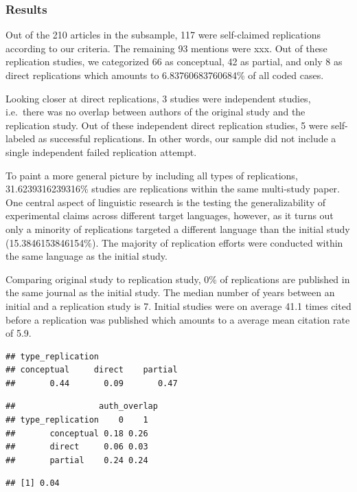 \documentclass[]{elsarticle} %
\begin{document}
\hypertarget{results-1}{%
\subsubsection{Results}\label{results-1}}

Out of the 210 articles in the subsample, 117 were self-claimed
replications according to our criteria. The remaining 93 mentions were
xxx. Out of these replication studies, we categorized 66 as conceptual,
42 as partial, and only 8 as direct replications which amounts to
6.83760683760684\% of all coded cases.

Looking closer at direct replications, 3 studies were independent
studies, i.e.~there was no overlap between authors of the original study
and the replication study. Out of these independent direct replication
studies, 5 were self-labeled as successful replications. In other words,
our sample did not include a single independent failed replication
attempt.

To paint a more general picture by including all types of replications,
31.6239316239316\% studies are replications within the same multi-study
paper. One central aspect of linguistic research is the testing the
generalizability of experimental claims across different target
languages, however, as it turns out only a minority of replications
targeted a different language than the initial study
(15.3846153846154\%). The majority of replication efforts were conducted
within the same language as the initial study.

Comparing original study to replication study, 0\% of replications are
published in the same journal as the initial study. The median number of
years between an initial and a replication study is 7. Initial studies
were on average 41.1 times cited before a replication was published
which amounts to a average mean citation rate of 5.9.

\begin{verbatim}
## type_replication
## conceptual     direct    partial 
##       0.44       0.09       0.47
\end{verbatim}

\begin{verbatim}
##                 auth_overlap
## type_replication    0    1
##       conceptual 0.18 0.26
##       direct     0.06 0.03
##       partial    0.24 0.24
\end{verbatim}

\begin{verbatim}
## [1] 0.04
\end{verbatim}
\end{document}
